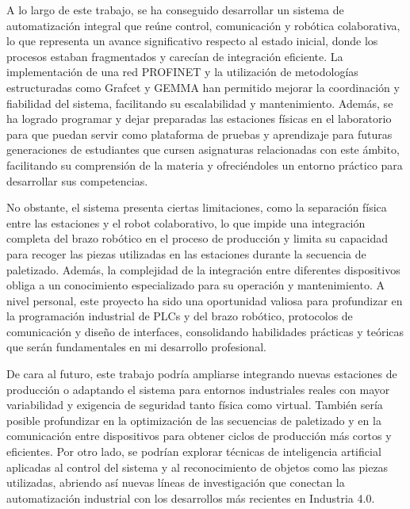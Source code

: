 A lo largo de este trabajo, se ha conseguido desarrollar un sistema de automatización integral que reúne control, comunicación y robótica colaborativa, lo que representa un avance significativo respecto al estado inicial, donde los procesos estaban fragmentados y carecían de integración eficiente. La implementación de una red PROFINET y la utilización de metodologías estructuradas como Grafcet y GEMMA han permitido mejorar la coordinación y fiabilidad del sistema, facilitando su escalabilidad y mantenimiento. Además, se ha logrado programar y dejar preparadas las estaciones físicas en el laboratorio para que puedan servir como plataforma de pruebas y aprendizaje para futuras generaciones de estudiantes que cursen asignaturas relacionadas con este ámbito, facilitando su comprensión de la materia y ofreciéndoles un entorno práctico para desarrollar sus competencias. 

No obstante, el sistema presenta ciertas limitaciones, como la separación física entre las estaciones y el robot colaborativo, lo que impide una integración completa del brazo robótico en el proceso de producción y limita su capacidad para recoger las piezas utilizadas en las estaciones durante la secuencia de paletizado. Además, la complejidad de la integración entre diferentes dispositivos obliga a un conocimiento especializado para su operación y mantenimiento. A nivel personal, este proyecto ha sido una oportunidad valiosa para profundizar en la programación industrial de PLCs y del brazo robótico, protocolos de comunicación y diseño de interfaces, consolidando habilidades prácticas y teóricas que serán fundamentales en mi desarrollo profesional.

De cara al futuro, este trabajo podría ampliarse integrando nuevas estaciones de producción o adaptando el sistema para entornos industriales reales con mayor variabilidad y exigencia de seguridad tanto física como virtual. También sería posible profundizar en la optimización de las secuencias de paletizado y en la comunicación entre dispositivos para obtener ciclos de producción más cortos y eficientes. Por otro lado, se podrían explorar técnicas de inteligencia artificial aplicadas al control del sistema y al reconocimiento de objetos como las piezas utilizadas, abriendo así nuevas líneas de investigación que conectan la automatización industrial con los desarrollos más recientes en Industria 4.0.
